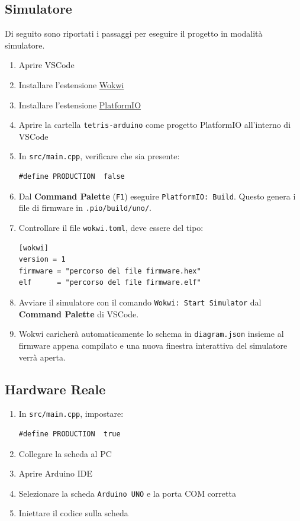 \documentclass[a4paper, 12pt]{article}
\begin{document}
\subsection{Simulatore}
Di seguito sono riportati i passaggi per eseguire il progetto in modalità simulatore.
\begin{enumerate}
	\item Aprire VSCode
	\item Installare l'estensione \href{https://marketplace.visualstudio.com/items?itemName=Wokwi.wokwi-vscode}{Wokwi}
	\item Installare l'estensione \href{https://marketplace.visualstudio.com/items?itemName=platformio.platformio-ide}{PlatformIO}
	\item Aprire la cartella \texttt{tetris-arduino} come progetto PlatformIO all'interno di VSCode
	\item In \texttt{src/main.cpp}, verificare che sia presente:
	      \begin{lstlisting}
#define PRODUCTION  false
	      \end{lstlisting}
	\item Dal \textbf{Command Palette} (\texttt{F1}) eseguire \texttt{PlatformIO: Build}.
	      Questo genera i file di firmware in \texttt{.pio/build/uno/}.
	\item Controllare il file \texttt{wokwi.toml}, deve essere del tipo:
	      \begin{verbatim}
[wokwi]
version = 1
firmware = "percorso del file firmware.hex"
elf      = "percorso del file firmware.elf"
	      \end{verbatim}
	\item Avviare il simulatore con il comando \texttt{Wokwi: Start Simulator} dal \textbf{Command Palette} di VSCode.
	\item Wokwi caricherà automaticamente lo schema in \texttt{diagram.json} insieme al firmware appena compilato e una nuova finestra interattiva del simulatore verrà aperta.
\end{enumerate}

\subsection{Hardware Reale}
\begin{enumerate}
	\item In \texttt{src/main.cpp}, impostare:
	      \begin{lstlisting}
#define PRODUCTION  true
	      \end{lstlisting}
	\item Collegare la scheda al PC
	\item Aprire Arduino IDE
	\item Selezionare la scheda \texttt{Arduino UNO} e la porta COM corretta
	\item Iniettare il codice sulla scheda
\end{enumerate}
\end{document}
